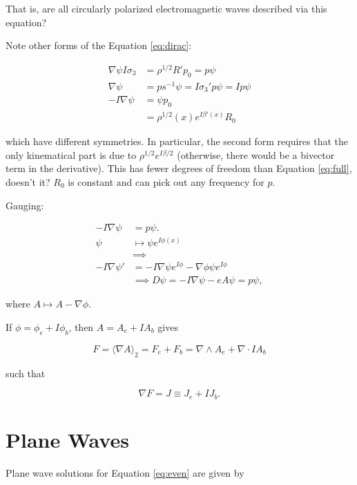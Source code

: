\documentclass{article}
\begin{document}
  That is, are all circularly polarized electromagnetic waves described via this equation?

  Note other forms of the Equation \ref{eq:dirac}:

  \begin{align}
    \nabla \psi I \sigma_3 &= \rho^{1/2} R' p_0 = p \psi \\
    \nabla \psi &= p s^{-1}\psi = I \sigma_3' p \psi = I p \psi \\
    -I \nabla \psi &= \psi p_0 \\
    &= \rho^{1/2}(x) e^{I \beta'(x)} R_0
  \end{align}

  which have different symmetries. In particular, the second form requires that the only kinematical part is due to $\rho^{1/2} e^{I \beta/2}$ (otherwise, there would be a bivector term in the derivative). This has fewer degrees of freedom than Equation \ref{eq:full}, doesn't it? $R_0$ is constant and can pick out any frequency for $p$. 

  Gauging: 

  \begin{align}
    -I \nabla \psi &= p \psi.\\
    \psi &\mapsto \psi e^{I \phi(x)} \\
    &\implies\\
    -I \nabla \psi' &= -I \nabla \psi e^{I \phi} - \nabla \phi \psi e^{I \phi}\\
    &\implies
    D \psi = -I \nabla \psi - eA \psi = p \psi,
  \end{align}

  where $A \mapsto A - \nabla \phi$.

  If $\phi = \phi_e + I \phi_b$, then $A = A_e + I A_b$ gives

  \begin{equation}
    F = \langle \nabla A \rangle_2 = F_e + F_b = \nabla \wedge A_e + \nabla \cdot I A_b
  \end{equation}

  such that

  \begin{equation}
    \nabla F = J \equiv J_e + I J_b.
  \end{equation}

  \section{Plane Waves} \label{waves}

  Plane wave solutions for Equation \ref{eq:even} are given by
\end{document}
